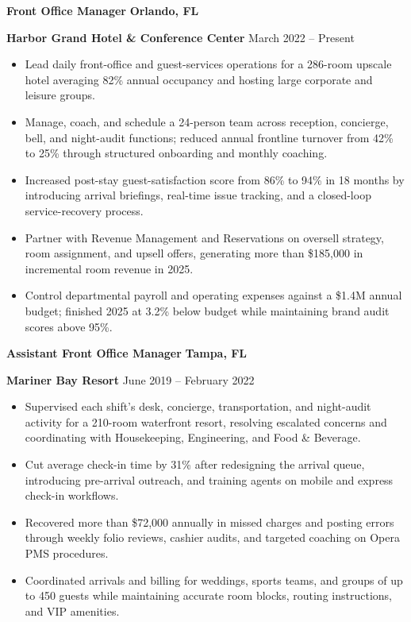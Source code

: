 \documentclass[10pt,letterpaper]{article}
\newcommand{\role}[4]{%
  \textbf{#1} \hfill {\small\bfseries #2}\par
  {\color{navy}\bfseries #3} \hfill {\small\color{slate} #4}\par
  \vspace{-1pt}%
}
\begin{document}
\role{Front Office Manager}{Orlando, FL}{Harbor Grand Hotel \& Conference Center}{March 2022 -- Present}
\begin{itemize}
  \item Lead daily front-office and guest-services operations for a 286-room upscale hotel averaging 82\% annual occupancy and hosting large corporate and leisure groups.
  \item Manage, coach, and schedule a 24-person team across reception, concierge, bell, and night-audit functions; reduced annual frontline turnover from 42\% to 25\% through structured onboarding and monthly coaching.
  \item Increased post-stay guest-satisfaction score from 86\% to 94\% in 18 months by introducing arrival briefings, real-time issue tracking, and a closed-loop service-recovery process.
  \item Partner with Revenue Management and Reservations on oversell strategy, room assignment, and upsell offers, generating more than \$185,000 in incremental room revenue in 2025.
  \item Control departmental payroll and operating expenses against a \$1.4M annual budget; finished 2025 at 3.2\% below budget while maintaining brand audit scores above 95\%.
\end{itemize}

\vspace{2.5pt}
\role{Assistant Front Office Manager}{Tampa, FL}{Mariner Bay Resort}{June 2019 -- February 2022}
\begin{itemize}
  \item Supervised each shift's desk, concierge, transportation, and night-audit activity for a 210-room waterfront resort, resolving escalated concerns and coordinating with Housekeeping, Engineering, and Food \& Beverage.
  \item Cut average check-in time by 31\% after redesigning the arrival queue, introducing pre-arrival outreach, and training agents on mobile and express check-in workflows.
  \item Recovered more than \$72,000 annually in missed charges and posting errors through weekly folio reviews, cashier audits, and targeted coaching on Opera PMS procedures.
  \item Coordinated arrivals and billing for weddings, sports teams, and groups of up to 450 guests while maintaining accurate room blocks, routing instructions, and VIP amenities.
\end{itemize}
\end{document}
